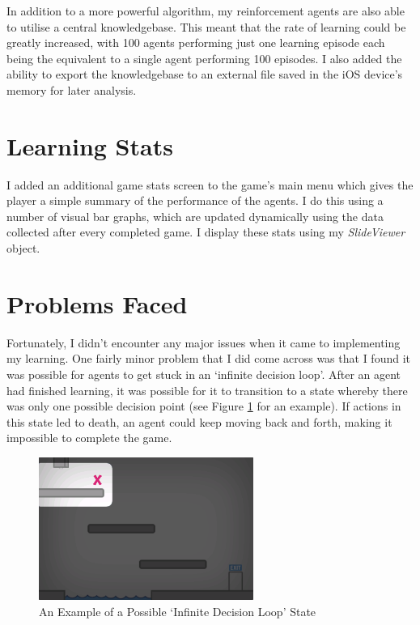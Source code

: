 \documentclass[a4paper,oneside]{report}
\begin{document}
In addition to a more powerful algorithm, my reinforcement agents are also able to utilise a central knowledgebase. This meant that the rate of learning could be greatly increased, with 100 agents performing just one learning episode each being the equivalent to a single agent performing 100 episodes. I also added the ability to export the knowledgebase to an external file saved in the iOS device's memory for later analysis.

\section{Learning Stats}

I added an additional game stats screen to the game's main menu which gives the player a simple summary of the performance of the agents. I do this using a number of visual bar graphs, which are updated dynamically using the data collected after every completed game. I display these stats using my \emph{SlideViewer} object.

\section{Problems Faced}
	
Fortunately, I didn't encounter any major issues when it came to implementing my learning. One fairly minor problem that I did come across was that I found it was possible for agents to get stuck in an `infinite decision loop'. After an agent had finished learning, it was possible for it to transition to a state whereby there was only one possible decision point (see Figure \ref{fig:InfiniteDecisionLoop} for an example). If actions in this state led to death, an agent could keep moving back and forth, making it impossible to complete the game.

\begin{figure}
  \centering
    \includegraphics[width=70mm]{sources/images/Screen_InfiniteLoop}
    \caption{An Example of a Possible `Infinite Decision Loop' State}
    \label{fig:InfiniteDecisionLoop}
\end{figure}
\end{document}
